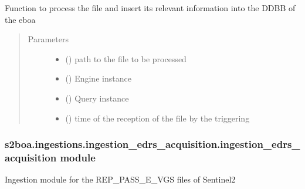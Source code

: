 \begin{fulllineitems}
\label{\detokenize{s2boa.ingestions:s2boa.ingestions.ingestion_dpc.ingestion_dpc.process_file}}
\sphinxAtStartPar
Function to process the file and insert its relevant information
into the DDBB of the eboa
\begin{quote}\begin{description}
\item[{Parameters}] \leavevmode\begin{itemize}
\item {} 
\sphinxAtStartPar
{} () \textendash{} path to the file to be processed

\item {} 
\sphinxAtStartPar
{} () \textendash{} Engine instance

\item {} 
\sphinxAtStartPar
{} () \textendash{} Query instance

\item {} 
\sphinxAtStartPar
{} () \textendash{} time of the reception of the file by the triggering

\end{itemize}

\end{description}\end{quote}

\end{fulllineitems}



\subsubsection{s2boa.ingestions.ingestion\_edrs\_acquisition.ingestion\_edrs\_acquisition module}
\label{\detokenize{s2boa.ingestions:module-s2boa.ingestions.ingestion_edrs_acquisition.ingestion_edrs_acquisition}}\label{\detokenize{s2boa.ingestions:s2boa-ingestions-ingestion-edrs-acquisition-ingestion-edrs-acquisition-module}}
\sphinxAtStartPar
Ingestion module for the REP\_PASS\_E\_VGS files of Sentinel\sphinxhyphen{}2

